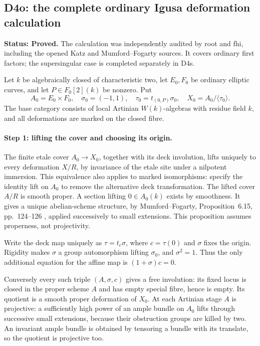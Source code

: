 \subsection*{D4o: the complete ordinary Igusa deformation calculation}
\textbf{Status: Proved.} The calculation was independently audited by root and fhi, including the opened Katz and Mumford--Fogarty sources. It covers ordinary first factors; the supersingular case is completed separately in D4s.

Let $k$ be algebraically closed of characteristic two, let $E_0,F_0$ be ordinary
elliptic curves, and let $P\in F_0[2](k)$ be nonzero. Put
\[
 A_0=E_0\times F_0,\quad \sigma_0=(-1,1),\quad
 \tau_0=t_{(0,P)}\sigma_0,\quad X_0=A_0/\langle\tau_0\rangle.
\]
The base category consists of local Artinian $W(k)$-algebras with residue
field $k$, and all deformations are marked on the closed fibre.

\paragraph{Step 1: lifting the cover and choosing its origin.}
The finite etale cover $A_0\to X_0$, together with its deck involution,
lifts uniquely to every deformation $X/R$, by invariance of the etale site
under a nilpotent immersion. This equivalence also applies to marked
isomorphisms: specify the identity lift on $A_0$ to remove the alternative
deck transformation. The lifted cover $A/R$ is smooth proper. A section
lifting $0\in A_0(k)$ exists by smoothness. It gives a unique abelian-scheme
structure, by Mumford--Fogarty, Proposition~6.15, pp.~124--126
\cite{DGJ_MumfordFogarty1982}, applied successively to small extensions.
This proposition assumes properness, not projectivity.

Write the deck map uniquely as $\tau=t_c\sigma$, where
$c=\tau(0)$ and $\sigma$ fixes the origin. Rigidity makes $\sigma$ a group
automorphism lifting $\sigma_0$, and $\sigma^2=1$. Thus the only additional
equation for the affine map is $(1+\sigma)c=0$.

Conversely every such triple $(A,\sigma,c)$ gives a free involution: its
fixed locus is closed in the proper scheme $A$ and has empty special
fibre, hence is empty. Its quotient is a smooth proper deformation of
$X_0$. At each Artinian stage $A$ is projective: a sufficiently high
power of an ample bundle on $A_0$ lifts through successive small
extensions, because their obstruction groups are killed by two.
An invariant ample bundle is obtained by tensoring a bundle with its
translate, so the quotient is projective too.

